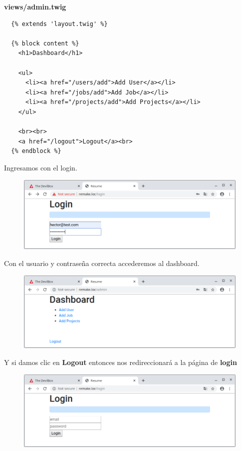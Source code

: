 \documentclass{article}
\begin{document}
\textbf{views/admin.twig}
\begin{verbatim}
  {% extends 'layout.twig' %}

  {% block content %}
    <h1>Dashboard</h1>

    <ul>
      <li><a href="/users/add">Add User</a></li>
      <li><a href="/jobs/add">Add Job</a></li>
      <li><a href="/projects/add">Add Projects</a></li>
    </ul>

    <br><br>
    <a href="/logout">Logout</a><br>
  {% endblock %}
\end{verbatim}

Ingresamos con el login.
\begin{figure}[h!]
  \centering
  \includegraphics[scale=0.5]{./Pictures/215_login.png}
\end{figure}

Con el usuario y contraseña correcta accederemos al dashboard.
\begin{figure}[h!]
  \centering
  \includegraphics[scale=0.5]{./Pictures/216_dashboard.png}
\end{figure}

Y si damos clic en \textbf{Logout} entonces nos redireccionará a la página de
\textbf{login}
\begin{figure}[h!]
  \centering
  \includegraphics[scale=0.5]{./Pictures/217_logout.png}
\end{figure}
\end{document}
